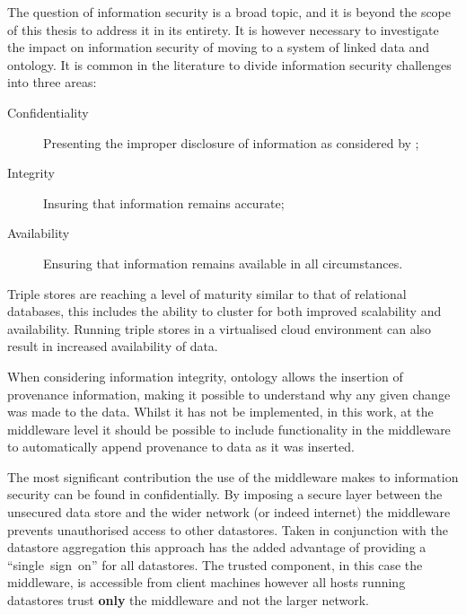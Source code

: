 The question of information security is a broad topic, and it is beyond the scope of this thesis to address it in its entirety. It is however necessary to investigate the impact on information security of moving to a system of linked data and ontology.
It is common in the literature to divide information security challenges into three areas: 
\begin{description}
    \item[Confidentiality] Presenting the improper disclosure of information as considered by \citep{Erlingsson2016};
    \item[Integrity] Insuring that information remains accurate;
    \item[Availability] Ensuring that information remains available in all circumstances. 
\end{description}

Triple stores are reaching a level of maturity similar to that of relational databases, this includes the ability to cluster for both improved scalability and availability. Running triple stores in a virtualised cloud environment can also result in increased availability of data. 

When considering information integrity, ontology allows the insertion of provenance information, making it possible to understand why any given change was made to the data. Whilst it has not be implemented, in this work, at the middleware level it should be possible to include functionality in the middleware to automatically append provenance to data as it was inserted. 

The most significant contribution the use of the middleware makes to information security can be found in confidentially. By imposing a secure layer between the unsecured data store and the wider network (or indeed internet) the middleware prevents unauthorised access to other datastores. Taken in conjunction with the datastore aggregation this approach has the added advantage of providing a ``single~sign~on'' for all datastores. The trusted component, in this case the middleware, is accessible from client machines however all hosts running datastores trust \textbf{only} the middleware and not the larger network. 


